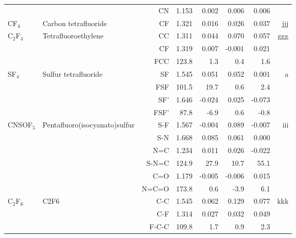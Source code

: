 \begin{table}
\begin{center}
\begin{tabular}{llrrrrrr}
             &                                    &CN            &     1.153   &     0.002 &     0.006 &     0.006 &       \\
 CF$_4$         & Carbon tetrafluoride               &CF            &     1.321   &     0.016 &     0.026 &     0.037 &   jjj \\
 C$_2$F$_4$        & Tetrafluoroethylene                &CC            &     1.311   &     0.044 &     0.070 &     0.057 &   ggg \\
             &                                    &CF            &     1.319   &     0.007 &    -0.001 &     0.021 &       \\
             &                                    &FCC         &     123.8   &       1.3 &       0.4 &       1.6   &       \\
 SF$_4$         & Sulfur tetrafluoride               &SF            &     1.545   &     0.051 &     0.052 &     0.001 &     a \\
             &                                    &FSF         &     101.5   &      19.7 &       0.6 &       2.4   &       \\
             &                                    &SF'           &     1.646   &    -0.024 &     0.025 &    -0.073 &       \\
             &                                    &FSF'        &      87.8   &      -6.9 &       0.6 &      -0.8   &       \\
 CNSOF$_5$      & Pentafluoro(isocyanato)sulfur      &S-F           &     1.567   &    -0.004 &     0.089 &    -0.007 &   iii \\
             &                                    &S-N           &     1.668   &     0.085 &     0.061 &     0.000 &       \\
             &                                    &N=C           &     1.234   &     0.011 &     0.026 &    -0.022 &       \\
             &                                    &S-N=C       &     124.9   &      27.9 &      10.7 &      55.1   &       \\
             &                                    &C=O           &     1.179   &    -0.005 &    -0.006 &     0.015 &       \\
             &                                    &N=C=O       &     173.8   &       0.6 &      -3.9 &       6.1   &       \\
 C$_2$F$_6$        & C2F6                               &C-C           &     1.545   &     0.062 &     0.129 &     0.077 &   kkk \\
             &                                    &C-F           &     1.314   &     0.027 &     0.032 &     0.049 &       \\
             &                                    &F-C-C       &     109.8   &       1.7 &       0.9 &       2.3   &       \\
\hline
\end{tabular}
\end{center}
\end{table}
\clearpage

